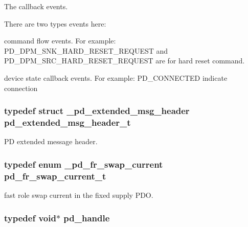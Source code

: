 The callback events. 

There are two types events here\-:
\begin{DoxyItemize}
\item command flow events. For example\-: P\-D\-\_\-\-D\-P\-M\-\_\-\-S\-N\-K\-\_\-\-H\-A\-R\-D\-\_\-\-R\-E\-S\-E\-T\-\_\-\-R\-E\-Q\-U\-E\-S\-T and P\-D\-\_\-\-D\-P\-M\-\_\-\-S\-R\-C\-\_\-\-H\-A\-R\-D\-\_\-\-R\-E\-S\-E\-T\-\_\-\-R\-E\-Q\-U\-E\-S\-T are for hard reset command.
\item device state callback events. For example\-: P\-D\-\_\-\-C\-O\-N\-N\-E\-C\-T\-E\-D indicate connection 
\end{DoxyItemize}\hypertarget{group__usb__pd__stack_gaac1fc676553ba20dd1712a8c7a63a3b0}{
\subsubsection[{pd\-\_\-extended\-\_\-msg\-\_\-header\-\_\-t}]{\setlength{\rightskip}{0pt plus 5cm}typedef struct {\bf \-\_\-pd\-\_\-extended\-\_\-msg\-\_\-header}  {\bf pd\-\_\-extended\-\_\-msg\-\_\-header\-\_\-t}}}\label{group__usb__pd__stack_gaac1fc676553ba20dd1712a8c7a63a3b0}


P\-D extended message header. 

\hypertarget{group__usb__pd__stack_gaed8d775bac19feb90ff7a857e9768366}{
\subsubsection[{pd\-\_\-fr\-\_\-swap\-\_\-current\-\_\-t}]{\setlength{\rightskip}{0pt plus 5cm}typedef enum {\bf \-\_\-pd\-\_\-fr\-\_\-swap\-\_\-current}  {\bf pd\-\_\-fr\-\_\-swap\-\_\-current\-\_\-t}}}\label{group__usb__pd__stack_gaed8d775bac19feb90ff7a857e9768366}


fast role swap current in the fixed supply P\-D\-O. 

\hypertarget{group__usb__pd__stack_ga9397835347d48ef48b6b0ecba6312213}{
\subsubsection[{pd\-\_\-handle}]{\setlength{\rightskip}{0pt plus 5cm}typedef void$\ast$ {\bf pd\-\_\-handle}}}\label{group__usb__pd__stack_ga9397835347d48ef48b6b0ecba6312213}


